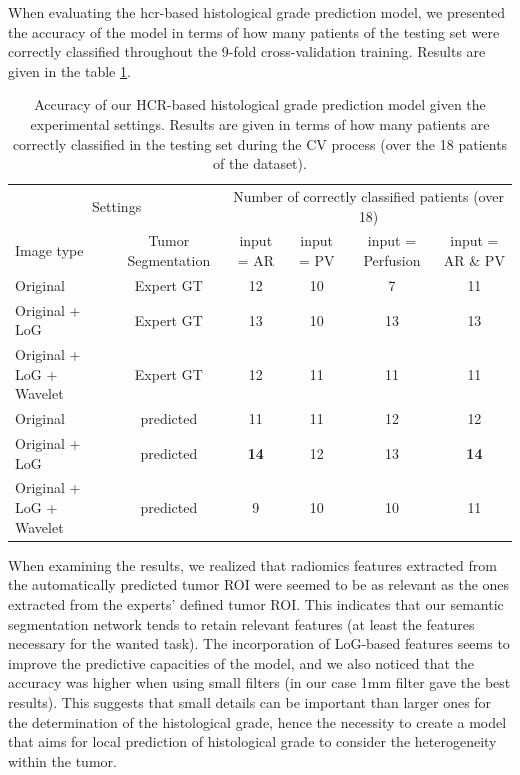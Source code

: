 \documentclass[]{article}
\renewcommand{\arraystretch}{5}
\begin{document}
When evaluating the \ac{hcr}-based histological grade prediction model, we presented the accuracy of the model in terms of how many patients of the testing set were correctly classified throughout the 9-fold cross-validation training. Results are given in the table \ref{tab:hcrGrade}.
\renewcommand{\arraystretch}{2}
\begin{table}[!htp]
	\centering
	\caption{Accuracy of our HCR-based histological grade prediction model given the experimental settings. Results are given in terms of how many patients are correctly classified in the testing set during the CV process (over the 18 patients of the dataset).}\label{tab:hcrGrade}
	\scriptsize
	\begin{tabular}{lccccc}\toprule
		\multicolumn{2}{c}{Settings} &\multicolumn{4}{c}{Number of correctly classified patients (over 18)} \\\cmidrule{1-6}
		Image type &Tumor Segmentation & input = AR &input = PV &input = Perfusion & input = AR \& PV \\\midrule
		Original & Expert GT & 12  & 10  & 7 & 11 \\
		Original + LoG & Expert GT & 13  & 10  & 13 & 13 \\
		Original + LoG + Wavelet & Expert GT & 12  & 11  & 11 & 11 \\
		Original & predicted & 11  & 11  & 12 & 12 \\
		Original + LoG & predicted & \textbf{14}  & 12  & 13 & \textbf{14} \\
		Original + LoG + Wavelet & predicted & 9  & 10  & 10 & 11 \\
		\bottomrule
	\end{tabular}
\end{table}
\renewcommand{\arraystretch}{5}


When examining the results, we realized that radiomics features extracted from the automatically predicted tumor ROI were seemed to be as relevant as the ones extracted from the experts' defined tumor ROI. This indicates that our semantic segmentation network tends to retain relevant features (at least the features necessary for the wanted task).
The incorporation of LoG-based features seems to improve the predictive capacities of the model, and we also noticed that the accuracy was higher when using small filters (in our case 1mm filter gave the best results). This suggests that small details can be important than larger ones for the determination of the histological grade, hence the necessity to create a model that aims for local prediction of histological grade to consider the heterogeneity within the tumor.
\end{document}
